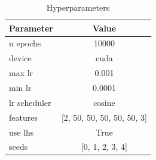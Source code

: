 \begin{table}[H]
    \centering
    \caption{Hyperparameters}
    \label{tab:hyper_params}
    \begin{tabular}{lc}
        \toprule
        \textbf{Parameter} & \textbf{Value} \\
        \midrule
        n epochs & 10000 \\
        device & cuda \\
        max lr & 0.001 \\
        min lr & 0.0001 \\
        lr scheduler & cosine \\
        features & [2, 50, 50, 50, 50, 50, 3] \\
        use lhs & True \\
        seeds & [0, 1, 2, 3, 4] \\
        \bottomrule
    \end{tabular}
\end{table}
